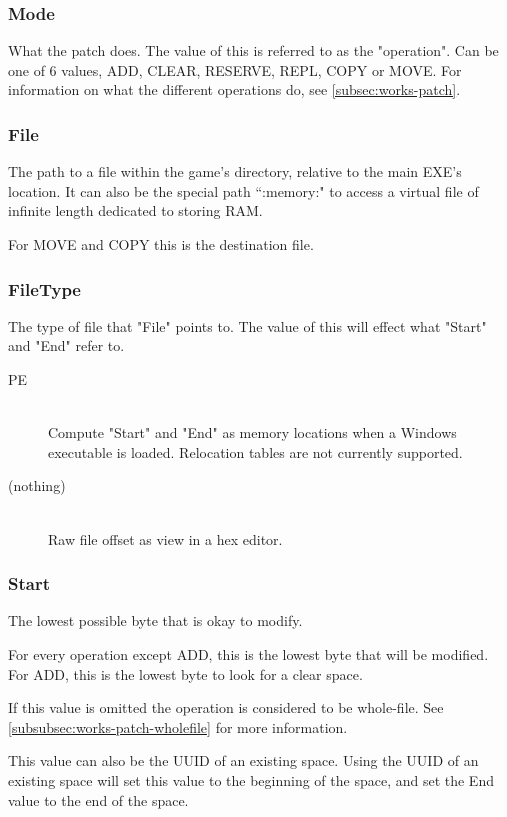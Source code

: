 \documentclass[12pt,a4paper,notitlepage]{article}
\begin{document}
\subsubsection{Mode}
What the patch does. The value of this is referred to as the "operation". Can be one of 6 values, ADD, CLEAR, RESERVE, REPL, COPY or MOVE. For information on what the different operations do, see \ref{subsec:works-patch}.


\subsubsection{File}
The path to a file within the game's directory, relative to the main EXE's location. It can also be the special path ``:memory:" to access a virtual file of infinite length dedicated to storing RAM.

For MOVE and COPY this is the destination file.

\subsubsection{FileType}
The type of file that "File" points to. The value of this will effect what "Start" and "End" refer to.

\begin{description}
\item[PE] \hfill \\ 
	Compute "Start" and "End" as memory locations when a Windows executable is loaded. Relocation tables are not currently supported.
\item[(nothing)] \hfill \\
	Raw file offset as view in a hex editor.
\end{description}

\subsubsection{Start}
The lowest possible byte that is okay to modify.

For every operation except ADD, this is the lowest byte that will be modified. For ADD, this is the lowest byte to look for a clear space.

If this value is omitted the operation is considered to be whole-file. See \ref{subsubsec:works-patch-wholefile} for more information.

This value can also be the UUID of an existing space. Using the UUID of an existing space will set this value to the beginning of the space, and set the End value to the end of the space.
\end{document}
